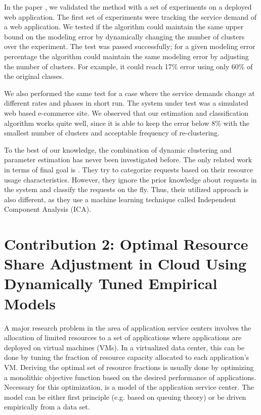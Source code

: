 \documentclass[11pt]{article}
\begin{document}
In the paper \cite{hamoun_ghanbari_tuning}, we validated the method with a set of experiments on a deployed web application. The first set of experiments were tracking the service demand of a web application.  
We tested if the algorithm could maintain the same upper bound on the modeling error by dynamically changing the number of clusters over the experiment. The test was passed successfully; for a given modeling error percentage the algorithm could maintain the same modeling error by adjusting the number of clusters. For example, it could reach 17\% error using only 60\% of the original classes. %
 
We also performed the same test for a case where the service demands change at different rates and phases in short run. The system under test was a simulated web based e-commerce site. We observed that our estimation and classification algorithm works quite well, since it is able to keep the error below 8\% with the smallest number of clusters and acceptable frequency of re-clustering. 

  To the best of our knowledge, the combination of dynamic clustering and parameter estimation has never been investigated before. The only related work in terms of final goal is \cite{sharma_automatic_2008}. They try to categorize requests based on their resource usage characteristics. However, they ignore the prior knowledge about requests in the system and classify the requests on the fly. Thus, their utilized approach is also different, as they use a machine learning technique called Independent Component Analysis (ICA). 

 \section{Contribution 2: Optimal Resource Share Adjustment in Cloud Using Dynamically Tuned Empirical Models}    
\label{optimization_no_reconfiguration_cost} 
 A major research problem in the area of application service centers involves the allocation of limited resources to a set of applications where applications are deployed on virtual machines (VMs). In a virtualized data center, this can be done by tuning the fraction of resource capacity allocated to each application's VM. 
Deriving the optimal set of resource fractions is usually done by optimizing a monolithic objective function based on the desired performance of applications. Necessary for this optimization, is a model of the application service center. The model can be either first principle (e.g. based on queuing theory) or be driven empirically from a data set.
 
\end{document}
